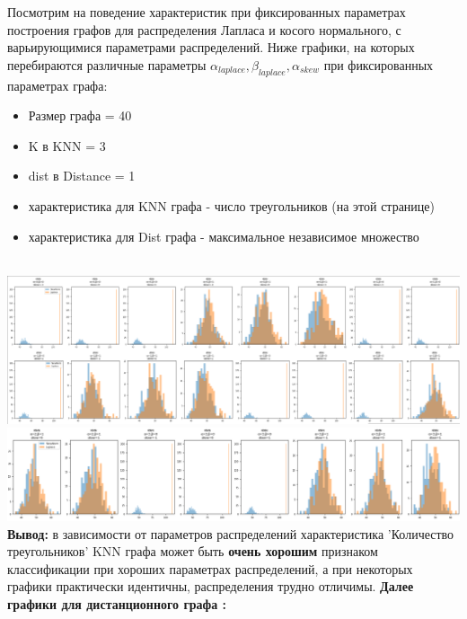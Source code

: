 Посмотрим на поведение характеристик при фиксированных параметрах построения графов для распределения Лапласа и косого нормального, с варьирующимися параметрами распределений. Ниже графики, на которых перебираются различные параметры $\alpha_{laplace}, \beta_{laplace}, \alpha_{skew}$ при фиксированных параметрах графа:
\begin{itemize}
    \item Размер графа =  40
    \item K в KNN = 3
    \item dist в Distance = 1
    \item характеристика для KNN графа - число треугольников (на этой странице)
    \item характеристика для Dist графа - максимальное независимое множество
\end{itemize}
\\

\hspace*{-1cm}
\includegraphics[width=1\textwidth]{Part-I-Ivanova/1_hist.png}\\ 
\hspace*{-0.5cm}
\includegraphics[width=1\textwidth]{Part-I-Ivanova/4_hist.png}\\ 
\textbf{Вывод:} в зависимости от параметров распределений характеристика 'Количество треугольников' KNN графа может быть \textbf{очень хорошим} признаком классификации при хороших параметрах распределений, а при некоторых графики практически идентичны, распределения трудно отличимы.
\newpage
\noindent\textbf{Далее графики для дистанционного графа :} \\\\


